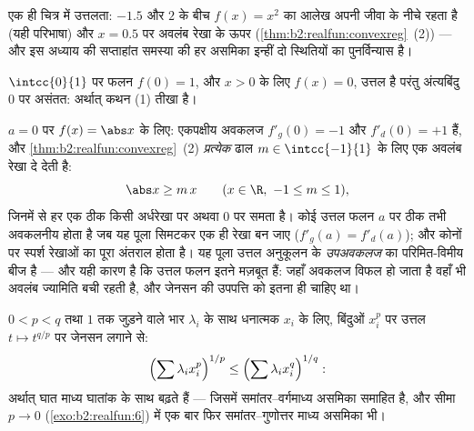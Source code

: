 \begin{omfigure}

{\small एक ही चित्र में उत्तलता: $-1.5$ और $2$ के बीच $f(x) = x^2$ का आलेख अपनी
जीवा के नीचे रहता है (यही परिभाषा) और $x = 0.5$ पर अवलंब रेखा के ऊपर (\cref{thm:b2:realfun:convexreg}~(2))
--- और इस अध्याय की सप्ताहांत समस्या की हर असमिका इन्हीं दो स्थितियों का
पुनर्विन्यास है।}
\end{omfigure}

\begin{example}[अंत्यबिंदु पर असंततता]
$\intcc{0}{1}$ पर फलन $f(0) = 1$, और $x > 0$ के लिए $f(x) = 0$, उत्तल है परंतु अंत्यबिंदु $0$ पर
असंतत: अर्थात् कथन (1) तीखा है।
\end{example}

\begin{example}[कोने और अवलंब रेखाओं का पूला]\label{ex:b2:realfun:corner}
$a = 0$ पर $f(x) = \abs x$ के लिए: एकपक्षीय अवकलज $f'_g(0) = -1$ और $f'_d(0) = +1$ हैं, और \cref{thm:b2:realfun:convexreg}~(2)
\emph{प्रत्येक} ढाल $m \in \intcc{-1}{1}$ के लिए एक अवलंब रेखा दे देती है:
\[
\abs x \geq m\,x \qquad (x \in \R,\ -1 \leq m \leq 1),
\]
जिनमें से हर एक ठीक किसी अर्धरेखा पर अथवा $0$ पर समता है। कोई उत्तल फलन
$a$ पर ठीक तभी अवकलनीय होता है जब यह पूला सिमटकर एक ही रेखा बन जाए
($f'_g(a) = f'_d(a)$); और कोनों पर स्पर्श रेखाओं का पूरा अंतराल होता है। यह पूला उत्तल
अनुकूलन के \emph{उपअवकलज} का परिमित-विमीय बीज है --- और यही कारण है कि
उत्तल फलन इतने मज़बूत हैं: जहाँ अवकलज विफल हो जाता है वहाँ भी अवलंब
ज्यामिति बची रहती है, और जेनसन की उपपत्ति को इतना ही चाहिए था।
\end{example}

\begin{example}[घात माध्य असमिका]\label{ex:b2:realfun:powermeans}
$0 < p < q$ तथा $1$ तक जुड़ने वाले भार $\lambda_i$ के साथ धनात्मक $x_i$ के लिए, बिंदुओं
$x_i^p$ पर उत्तल $t \mapsto t^{q/p}$ पर जेनसन लगाने से:
\[
\Bigl(\sum \lambda_i x_i^{p}\Bigr)^{1/p}
\leq \Bigl(\sum \lambda_i x_i^{q}\Bigr)^{1/q} :
\]
अर्थात् घात माध्य घातांक के साथ बढ़ते हैं --- जिसमें समांतर--वर्गमाध्य
असमिका समाहित है, और सीमा $p \to 0$ (\cref{exo:b2:realfun:6}) में एक बार फिर समांतर--गुणोत्तर माध्य
असमिका भी।
\end{example}

